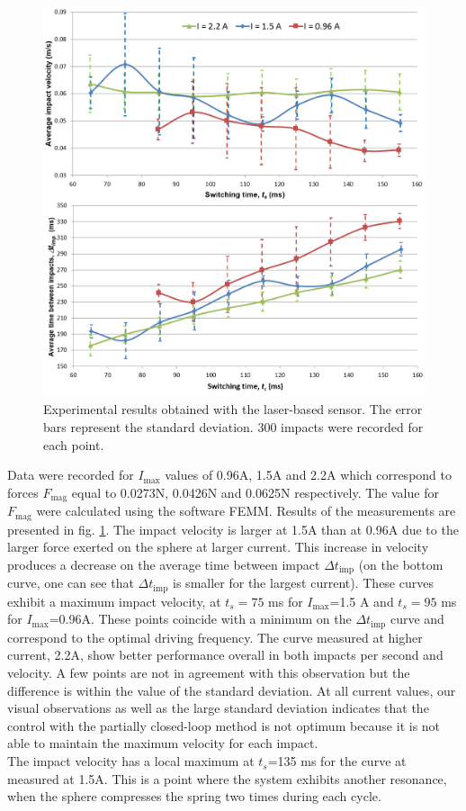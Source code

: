 \documentclass[letterpaper, 10 pt, conference]{ieeeconf}  %
\begin{document}
\begin{figure}
  \includegraphics[width=\linewidth]{laser_exp.png}
  \caption{Experimental results obtained with the laser-based sensor. The error bars represent the standard deviation. 300 impacts were recorded for each point.}
  \label{laser_exp}
	\vspace{-2em}
\end{figure}

Data were recorded for $I_{\textrm{max}}$ values of 0.96A, 1.5A and 2.2A which correspond to forces $F_{\textrm{mag}}$ equal to 0.0273N, 0.0426N and 0.0625N respectively. The value for $F_{\textrm{mag}}$ were calculated using the software FEMM. Results of the measurements are presented in fig. \ref{laser_exp}. The impact velocity is larger at 1.5A than at 0.96A due to the larger force exerted on the sphere at larger current. This increase in velocity produces a decrease on the average time between impact $\Delta t_{\textrm{imp}}$ (on the bottom curve, one can see that $\Delta t_{\textrm{imp}}$ is smaller for the largest current). These curves exhibit a maximum impact velocity, at $t_s=75$ ms for $I_{\textrm{max}}$=1.5 A and $t_s=95$ ms for $I_{\textrm{max}}$=0.96A. These points coincide with a minimum on the $\Delta t_{\textrm{imp}}$ curve and correspond to the optimal driving frequency. The curve measured at higher current, 2.2A, show better performance overall in both impacts per second and velocity. A few points are not in agreement with this observation but the difference is within the value of the standard deviation. At all current values, our visual observations as well as the large standard deviation indicates that the control with the partially closed-loop method is not optimum because it is not able to maintain the maximum velocity for each impact.\\
The impact velocity has a local maximum at $t_s$=135 ms for the curve at measured at 1.5A. This is a point where the system exhibits another resonance, when the sphere compresses the spring two times during each cycle.
\end{document}
